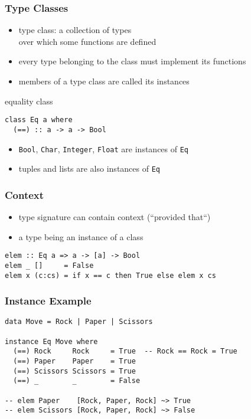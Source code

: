 \documentclass[dvipsnames]{beamer}
\theoremstyle{plain}
\begin{document}
\begin{frame}[fragile]
  \frametitle{Type Classes}

  \begin{itemize}
    \item \alert{type class}: a collection of types\\
      over which some functions are defined
    \item every type belonging to the class must implement its functions
    \item members of a type class are called its \alert{instances}
  \end{itemize}

  \pause
  \begin{exampleblock}{equality class}
    \begin{lstlisting}
class Eq a where
  (==) :: a -> a -> Bool
    \end{lstlisting}
    \begin{itemize}
      \item \lstinline|Bool|, \lstinline|Char|, \lstinline|Integer|, \lstinline|Float|
        are instances of \lstinline|Eq|
      \item tuples and lists are also instances of \lstinline|Eq|
    \end{itemize}
  \end{exampleblock}
\end{frame}

\begin{frame}[fragile]
  \frametitle{Context}

  \begin{itemize}
    \item type signature can contain context (``provided that``)
    \item a type being an instance of a class
  \end{itemize}

  \begin{exampleblock}{}
    \begin{lstlisting}
elem :: Eq a => a -> [a] -> Bool
elem _ []     = False
elem x (c:cs) = if x == c then True else elem x cs
    \end{lstlisting}
  \end{exampleblock}
\end{frame}

\begin{frame}[fragile]
  \frametitle{Instance Example}

  \begin{lstlisting}
data Move = Rock | Paper | Scissors

instance Eq Move where
  (==) Rock     Rock     = True  -- Rock == Rock = True
  (==) Paper    Paper    = True
  (==) Scissors Scissors = True
  (==) _        _        = False

-- elem Paper    [Rock, Paper, Rock] ~> True
-- elem Scissors [Rock, Paper, Rock] ~> False
  \end{lstlisting}
\end{frame}
\end{document}
